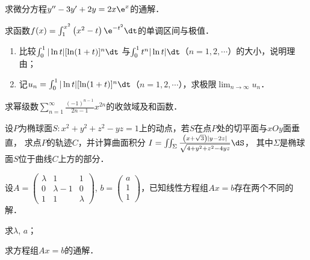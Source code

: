 \documentclass[plain,noanswer,medmath]{../../template/jnuexam}
\begin{document}


\begin{problem}[points=10]
求微分方程$y'' - 3y' + 2y = 2x\e^x$的通解．
\end{problem}


\begin{problem}[points=10]
求函数$f(x) = \int_1^{x^2} \left(x^2 - t \right) \e^{- t^2} \dt$的单调区间与极值．
\end{problem}


\begin{problem}[points=10]
\begin{enumerate}
\item
比较$\int_0^1 |\ln t|[\ln(1+t)]^n\dt$
与$\int_0^1 t^n |\ln t|\dt$（$n=1,2,\cdots$）的大小，说明理由；
\item
记$u_n = \int_0^1 |\ln t|[\ln(1+t)]^n\dt$（$n=1,2,\cdots$），求极限$\lim_{n\to\infty} u_n$．
\end{enumerate}
\end{problem}


\begin{problem}[points=10]
求幂级数$\sum_{n = 1}^{\infty}\frac{(- 1)^{n - 1}}{2n - 1}x^{2n}$的收敛域及和函数．
\end{problem}


\begin{problem}[points=10]
设$P$为椭球面$S: x^2 + y^2 + z^2 - yz = 1$上的动点，若$S$在点$P$处的切平面与$xOy$面垂直，
求点$P$的轨迹$C$，并计算曲面积分
$I = \iint_{\Sigma}\frac{\left(x + \sqrt{3} \right)|y - 2z|}{\sqrt{4 + y^2 + z^2 - 4yz}} \dS$，
其中$\Sigma$是椭球面$S$位于曲线$C$上方的部分．
\end{problem}


\begin{problem}[points=11]
设$A = \begin{pmatrix}
  \lambda & 1           & 1 \\
  0       & \lambda - 1 & 0 \\
  1       & 1           & \lambda
\end{pmatrix}$, $b = \begin{pmatrix}
  a \\
  1 \\
  1
\end{pmatrix}$，已知线性方程组$Ax = b$存在两个不同的解．\par
\begin{enumerate*}
\item 求$\lambda$, $a$；
\item 求方程组$Ax = b$的通解．
\end{enumerate*}
\end{problem}
\end{document}
